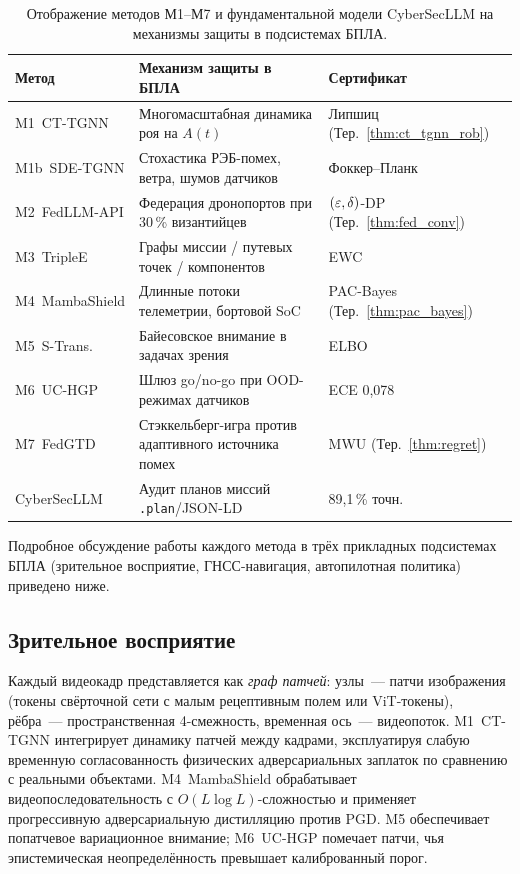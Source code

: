 \begin{table}[H]
\centering
\caption{Отображение методов \textsf{М1}--\textsf{М7} и фундаментальной
модели \textsf{CyberSecLLM} на механизмы защиты в подсистемах БПЛА.}
\label{tab:uav_mapping}
\small
\setlength{\tabcolsep}{4pt}
\renewcommand{\arraystretch}{1.2}
\begin{tabularx}{\linewidth}{@{}lXl@{}}
\toprule
\textbf{Метод} & \textbf{Механизм защиты в БПЛА} & \textbf{Сертификат}\\
\midrule
\textsf{M1~CT-TGNN}    & Многомасштабная динамика роя на $A(t)$               & Липшиц (Тер.~\ref{thm:ct_tgnn_rob})\\
\textsf{M1b~SDE-TGNN}  & Стохастика РЭБ-помех, ветра, шумов датчиков          & Фоккер--Планк\\
\textsf{M2~FedLLM-API} & Федерация дронопортов при 30\,\% византийцев         & $(\varepsilon,\delta)$-DP (Тер.~\ref{thm:fed_conv})\\
\textsf{M3~TripleE}    & Графы миссии / путевых точек / компонентов           & EWC\\
\textsf{M4~MambaShield}& Длинные потоки телеметрии, бортовой SoC              & PAC-Bayes (Тер.~\ref{thm:pac_bayes})\\
\textsf{M5~S-Trans.}   & Байесовское внимание в задачах зрения                & ELBO\\
\textsf{M6~UC-HGP}     & Шлюз go/no-go при OOD-режимах датчиков               & ECE 0,078\\
\textsf{M7~FedGTD}     & Стэккельберг-игра против адаптивного источника помех & MWU (Тер.~\ref{thm:regret})\\
\textsf{CyberSecLLM}   & Аудит планов миссий \texttt{.plan}/JSON-LD           & 89,1\,\% точн.\\
\bottomrule
\end{tabularx}
\end{table}

Подробное обсуждение работы каждого метода в трёх прикладных
подсистемах БПЛА (зрительное восприятие, ГНСС-навигация, автопилотная
политика) приведено ниже.

\subsection{Зрительное восприятие}
\label{sec:uav_vision}

Каждый видеокадр представляется как \emph{граф патчей}: узлы~--- патчи
изображения (токены свёрточной сети с малым рецептивным полем или
ViT-токены), рёбра~--- пространственная 4-смежность, временная ось~---
видеопоток. \textsf{M1~CT-TGNN} интегрирует динамику патчей между
кадрами, эксплуатируя слабую временную согласованность физических
адверсариальных заплаток по сравнению с реальными объектами.
\textsf{M4~MambaShield} обрабатывает видеопоследовательность с
$O(L\log L)$-сложностью и применяет прогрессивную адверсариальную
дистилляцию против PGD. \textsf{M5} обеспечивает попатчевое
вариационное внимание; \textsf{M6~UC-HGP} помечает патчи, чья
эпистемическая неопределённость превышает калиброванный порог.

